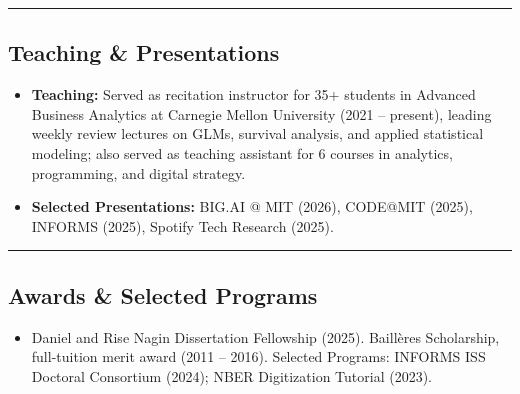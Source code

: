 \documentclass[10pt,letterpaper]{article}
\newcommand{\hsep}{\noindent\textcolor{gray}{\rule{\textwidth}{0.5pt}}}
\newcommand{\block}[1]{\begin{samepage}\hsep\subsection*{#1}\end{samepage}}
\begin{document}
\block{Teaching \& Presentations}

\begin{itemize}[leftmargin=0pt, label={}]
\item \textbf{Teaching:} Served as recitation instructor for 35+ students in Advanced Business Analytics at Carnegie Mellon University (2021 -- present), leading weekly review lectures on GLMs, survival analysis, and applied statistical modeling; also served as teaching assistant for 6 courses in analytics, programming, and digital strategy.
\item \textbf{Selected Presentations:} BIG.AI @ MIT (2026), CODE@MIT (2025), INFORMS (2025), Spotify Tech Research (2025).
\end{itemize}

\block{Awards \& Selected Programs}

\begin{itemize}[leftmargin=0pt, label={}]
\item Daniel and Rise Nagin Dissertation Fellowship (2025). Baill\`eres Scholarship, full-tuition merit award (2011 -- 2016). Selected Programs: INFORMS ISS Doctoral Consortium (2024); NBER Digitization Tutorial (2023).
\end{itemize}
\end{document}
